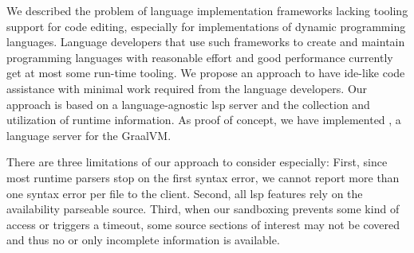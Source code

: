 \documentclass[sigplan,10pt,screen]{acmart}
\makeatletter
\renewcommand\subparagraph{\@startsection{subparagraph}{5}{\z@}%
   {-.2\baselineskip \@plus -2\p@ \@minus -.2\p@}%
   {-3.5\p@}%
   {\@subparfont\@addspaceafter}}
\makeatother
\begin{document}
{We described the problem of language implementation frameworks lacking tooling
support for code editing, especially for implementations of dynamic programming
languages. Language developers that use such frameworks to create and maintain
programming languages with reasonable effort and good performance currently get
at most some run-time tooling. We propose an approach to have \acs{ide}-like code
assistance with minimal work required from the language developers. Our approach
is based on a language-agnostic \ac{lsp} server and the collection and utilization
of runtime information. As proof of concept, we have implemented \graallsp, a
language server for the GraalVM.


There are three limitations of our approach to consider especially: First, since
most runtime parsers stop on the first syntax error, we cannot report more than
one syntax error per file to the client. Second, all \ac{lsp} features rely on
the availability parseable source. Third, when our sandboxing prevents some kind
of access or triggers a timeout, some source sections of interest may not be
covered and thus no or only incomplete information is available.


}
\end{document}
